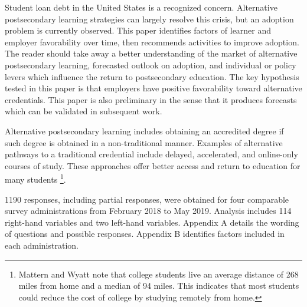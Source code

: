 \documentclass[review]{elsarticle}
\begin{document}
        Student loan debt in the United States is a recognized concern\cite{friedman2018student}.
        Alternative postsecondary learning strategies can largely resolve this crisis, but an adoption problem is currently observed.
        This paper identifies factors of learner and employer favorability over time, then recommends activities to improve adoption.
        The reader should take away a better understanding of the market of alternative postsecondary learning, forecasted outlook on adoption,
        and individual or policy levers which influence the return to postsecondary education.
        The key hypothesis tested in this paper is that employers have positive favorability toward alternative credentials.
        This paper is also preliminary in the sense that it produces forecasts which can be validated in subsequent work.

        Alternative postsecondary learning includes obtaining an accredited degree if such degree is obtained in a non-traditional manner.
        Examples of alternative pathways to a traditional credential include delayed, accelerated, and online-only courses of study.
        These approaches offer better access and return to education for many students
        \footnote{
            Mattern and Wyatt\cite{mattern2009student} note that college students live an average distance of
            268 miles from home and a median of 94 miles. This indicates that most students could reduce
            the cost of college by studying remotely from home.
        }.
        
        1190 responses, including partial responses, were obtained for four
        comparable survey administrations from February 2018 to May 2019.
        Analysis includes 114 right-hand variables and two left-hand variables.
        Appendix A details the wording of questions and possible responses.
        Appendix B identifies factors included in each administration.
\end{document}
